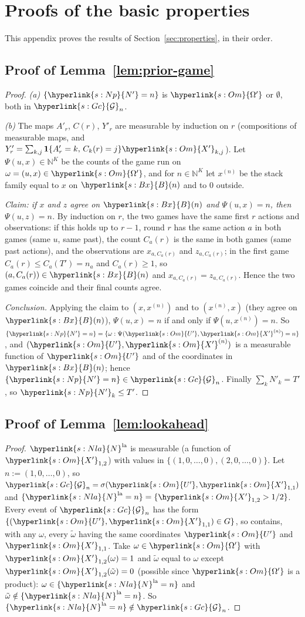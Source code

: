 \documentclass[11pt]{article}
\newcommand{\sy}[2]{\hyperlink{#1}{#2}}
\newcommand{\N}{\mathbb{N}}
\newcommand{\ind}{\mathbf{1}}
\newcommand{\Gc}{\sy{s:Gc}{\mathcal{G}}}
\newcommand{\Bx}{\sy{s:Bx}{B}}
\newcommand{\Nla}{\sy{s:Nla}{N}^{\mathrm{la}}}
\newcommand{\Np}{\sy{s:Np}{N'}}
\newcommand{\Om}{\sy{s:Om}{\Omega'}}
\newcommand{\Up}{\sy{s:Om}{U'}}
\newcommand{\Xp}{\sy{s:Om}{X'}}
\begin{document}
\section{Proofs of the basic properties}\label{sec:proofs-properties}

This appendix proves the results of Section~\ref{sec:properties}, in their order.

\subsection{Proof of Lemma~\ref{lem:prior-game}}

\begin{proof}
\emph{(a)} $\{\Np=n\}$ is $\Om$ or $\emptyset$, both in $\Gc_n$.

\emph{(b)} The maps $A'_r$, $C(r)$, $Y'_r$ are measurable by induction on $r$ (compositions of
measurable maps, and $Y'_r=\sum_{k,j}\ind\{A'_r=k,\,C_k(r)=j\}\Xp_{k,j}$). Let $\Psi(u,x)\in\N^K$ be
the counts of the game run on $\omega=(u,x)\in\Om$, and for $n\in\N^K$ let $x^{(n)}$ be the stack
family equal to $x$ on $\Bx(n)$ and to $0$ outside.

\emph{Claim: if $x$ and $z$ agree on $\Bx(n)$ and $\Psi(u,x)=n$, then $\Psi(u,z)=n$.} By induction on
$r$, the two games have the same first $r$ actions and observations: if this holds up to $r-1$,
round $r$ has the same action $a$ in both games (same $u$, same past), the count $C_a(r)$ is the
same in both games (same past actions), and the observations are $x_{a,C_a(r)}$ and $z_{a,C_a(r)}$;
in the first game $C_a(r)\le C_a(T')=n_a$ and $C_a(r)\ge1$, so $(a,C_a(r))\in\Bx(n)$ and
$x_{a,C_a(r)}=z_{a,C_a(r)}$. Hence the two games coincide and their final counts agree.

\emph{Conclusion.} Applying the claim to $(x,x^{(n)})$ and to $(x^{(n)},x)$ (they agree on $\Bx(n)$),
$\Psi(u,x)=n$ if and only if $\Psi(u,x^{(n)})=n$. So $\{\Np=n\}=\{\omega:\Psi(\Up,\Xp^{(n)})=n\}$, and
$(\Up,\Xp^{(n)})$ is a measurable function of $\Up$ and of the coordinates in $\Bx(n)$; hence
$\{\Np=n\}\in\Gc_n$. Finally $\sum_kN'_k=T'$, so $\Np_k\le T'$.
\end{proof}

\subsection{Proof of Lemma~\ref{lem:lookahead}}

\begin{proof}
$\Nla$ is measurable (a function of $\Xp_{1,2}$) with values in $\{(1,0,\dots,0),(2,0,\dots,0)\}$.
Let $n:=(1,0,\dots,0)$, so $\Gc_n=\sigma(\Up,\Xp_{1,1})$ and $\{\Nla=n\}=\{\Xp_{1,2}>1/2\}$. Every event
of $\Gc_n$ has the form $\{(\Up,\Xp_{1,1})\in G\}$, so contains, with any $\omega$, every $\tilde\omega$
having the same coordinates $\Up$ and $\Xp_{1,1}$. Take $\omega\in\Om$ with $\Xp_{1,2}(\omega)=1$ and
$\tilde\omega$ equal to $\omega$ except $\Xp_{1,2}(\tilde\omega)=0$ (possible since $\Om$ is a
product): $\omega\in\{\Nla=n\}$ and $\tilde\omega\notin\{\Nla=n\}$. So $\{\Nla=n\}\notin\Gc_n$.
\end{proof}
\end{document}
